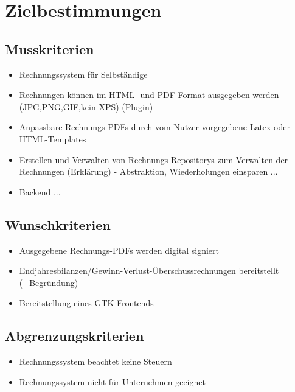 
\section{Zielbestimmungen}



\subsection{Musskriterien}

\begin{itemize}
	\item Rechnungssystem für Selbständige  
	\item Rechnungen können im HTML- und PDF-Format ausgegeben werden (JPG,PNG,GIF,kein XPS) (Plugin)
	\item Anpassbare Rechnungs-PDFs durch vom Nutzer vorgegebene Latex oder HTML-Templates
	\item Erstellen und Verwalten von Rechnungs-Repositorys zum Verwalten der Rechnungen (Erklärung) - Abstraktion, Wiederholungen einsparen ...
	\item Backend ... 
\end{itemize}

\subsection{Wunschkriterien}

\begin{itemize}
	\item Ausgegebene Rechnungs-PDFs werden digital signiert
	\item Endjahresbilanzen/Gewinn-Verlust-Überschussrechnungen bereitstellt (+Begründung)
	\item Bereitstellung eines GTK-Frontends
\end{itemize}

\subsection{Abgrenzungskriterien}

\begin{itemize}
	\item Rechnungssystem beachtet keine Steuern
	\item Rechnungssystem nicht für Unternehmen geeignet
\end{itemize}